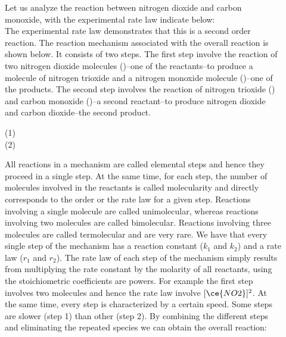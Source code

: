 \documentclass[main.tex]{subfiles}
\begin{document}
\begin{description}
\item[] 
Let us analyze the reaction between nitrogen dioxide and carbon monoxide, with the experimental rate law indicate below:
 \\
The experimental rate law demonstrates that this is a second order reaction. The reaction mechanism associated with the overall reaction is shown below. It consists of two steps. The first step involve the reaction of two nitrogen dioxide molecules ()--one of the reactants--to produce a molecule of nitrogen trioxide and a nitrogen monoxide molecule ()--one of the products. The second step involves the reaction of nitrogen trioxide () and carbon monoxide ()--a second reactant--to produce nitrogen dioxide and carbon dioxide--the second product.
\begin{center}(1)\hfill{} \\
(2)\hfill{} \end{center}
All reactions in a mechanism are called elemental steps and hence they proceed in a single step. At the same time, for each step, the number of molecules involved in the reactants is called molecularity and directly corresponds to the order or the rate law for a given step. Reactions involving a single molecule are called unimolecular, whereas reactions involving two molecules are called bimolecular. Reactions involving three molecules are called termolecular and are very rare. We have that every single step of the mechanism has a reaction constant ($k_1$ and $k_2$) and a rate law ($r_1$ and $r_2$). The rate law of each step of the mechanism simply results from multiplying the rate constant by the molarity of all reactants, using the stoichiometric coefficients are powers. For example the first step involves two  molecules and hence the rate law involve $[\ce{NO2}]^2$. At the same time, every step is characterized by a certain speed. Some steps are slower (step 1) than other (step 2). By combining the different steps and eliminating the repeated species we can obtain the overall reaction:

\end{description}
\end{document}
